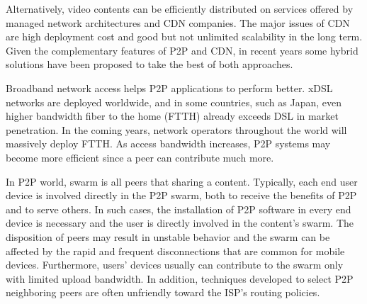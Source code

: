 \documentclass[10pt,final,journal,a4paper]{IEEEtran}
\begin{document}
Alternatively, video contents can be efficiently distributed on services offered by managed network architectures and CDN companies.
The major issues of CDN are high deployment cost and good but not unlimited scalability in the long term.  
Given the complementary features of P2P and CDN, in recent years some hybrid solutions have been proposed \cite{Huang:2008:UHC:1496046.1496064,4772628,Yin:2009:DDH:1631272.1631279} to take the best of both approaches.

Broadband network access helps P2P applications to perform better. xDSL networks are deployed worldwide, and in some countries, such as Japan, even higher bandwidth fiber to the home (FTTH) already exceeds DSL in market penetration. 
In the coming years, network operators throughout the world will massively deploy FTTH. 
As access bandwidth increases, P2P systems may become more efficient since a peer can contribute much more.

In P2P world, swarm is all peers that sharing a content. 
Typically, each end user device is involved directly in the P2P swarm, both to receive the benefits of P2P and to serve others.  
In such cases, the installation of P2P software in every end device is necessary and the user is directly involved in the content's swarm.
The disposition of peers may result in unstable behavior and the swarm can be affected by the rapid and frequent disconnections that are common for mobile devices.  
Furthermore, users' devices usually can contribute to the swarm only with limited upload bandwidth.  
In addition, techniques developed to select P2P neighboring peers are often unfriendly toward the ISP's routing policies.
\end{document}
